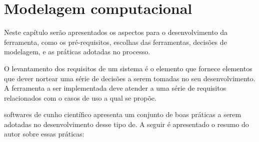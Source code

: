 \chapter{Modelagem computacional}

Neste capítulo serão apresentados os aspectos para o desenvolvimento da ferramenta, como os pré-requisitos, escolhas das ferramentas, decisões de modelagem, e as práticas adotadas no processo.

O levantamento dos requisitos de um sistema é o elemento que fornece elementos que dever nortear uma série de decisões a serem tomadas no seu desenvolvimento.
A ferramenta a ser implementada deve atender a uma série de requisitos relacionados com o casos de uso a qual se propõe.


softwares de cunho científico  apresenta um conjunto de boas práticas a serem adotadas no desenvolvimento desse tipo de. A seguir é apresentado o resumo do autor sobre essas práticas:

